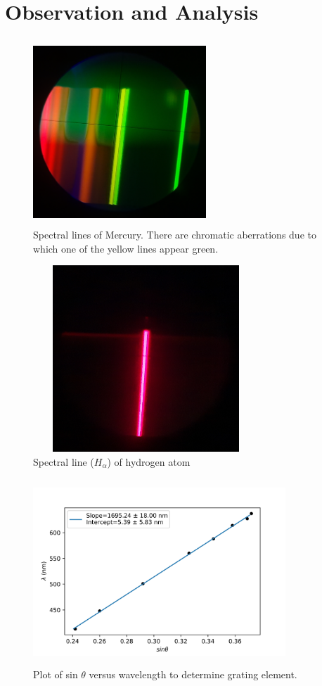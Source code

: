 \documentclass[a4paper, amsfonts, amssymb, amsmath, reprint, showkeys, nofootinbib, twoside]{revtex4-1}
\begin{document}
\section{Observation and Analysis}

\begin{figure}[H] %
	\centering
	\includegraphics[width=6.5cm,height=7cm]{3} 
	\caption{Spectral lines of Mercury. There are chromatic aberrations due to which one of the yellow lines appear green.}
	\label{3}
\end{figure}

\begin{figure}[H] %
	\centering
	\includegraphics[width=8.5cm,height=7cm]{2} 
	\caption{Spectral line ($H_{\alpha}$) of hydrogen atom}
	\label{2}
\end{figure}

\begin{figure}[H] %
	\centering
	\includegraphics[width=9.5cm,height=7cm]{4} 
	\caption{Plot of sin $\theta$ versus wavelength to determine grating element.}
	\label{4}
\end{figure}
\end{document}
